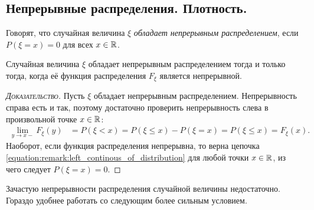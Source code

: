 \documentclass[../main.tex]{subfiles}
\begin{document}
\subsection{Непрерывные распределения. Плотность.}

\begin{df}
 Говорят, что случайная величина $\xi$ \textit{обладает непрерывным распределением}, если $P(\xi = x) = 0$ для всех $x \in \mathbb{R}$.
\end{df}

\begin{remrk}
 Случайная величина $ \xi $ обладает непрерывным распределением тогда и только тогда, когда её функция распределения $ F_{\xi} $ является непрерывной.
\end{remrk}
\begin{proof}[\normalfont\textsc{Доказательство}]
 Пусть $ \xi $ обладает непрерывным распределением. Непрерывность справа есть и так, поэтому достаточно проверить непрерывность слева в произвольной точке $ x \in \mathbb{R} $:
 \begin{align}
  \label{equation:remark:left_continous_of_distribution}
  \lim_{y \to x-} F_{\xi}(y) &= P(\xi < x) = P(\xi \leqslant x) - P(\xi = x) = P(\xi \leqslant x) = F_{\xi}(x).
 \end{align} Наоборот, если функция распределения непрерывна, то верна цепочка \eqref{equation:remark:left_continous_of_distribution} для любой точки $ x \in \mathbb{R} $, из чего следует $ P(\xi = x) = 0 $.
\end{proof}

Зачастую непрерывности распределения случайной величины недостаточно. Гораздо удобнее работать со следующим более сильным условием.
\end{document}
